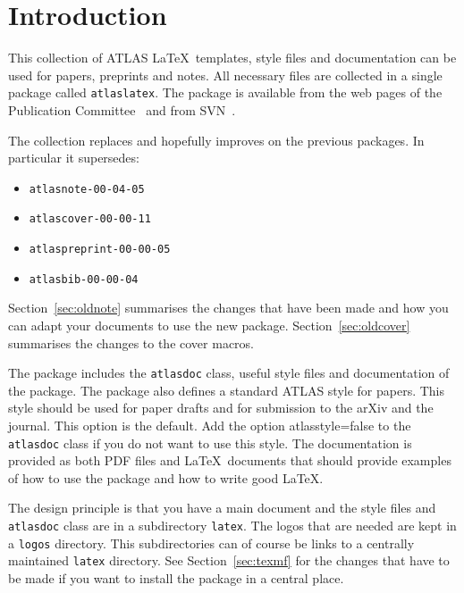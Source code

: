 \documentclass[UKenglish]{latex/atlasdoc}
\author{Ian C. Brock}
\affil{University of Bonn}
\newcommand{\File}[1]{\texttt{#1}\xspace}
\newcommand{\Option}[1]{\textsf{#1}\xspace}
\newcommand{\Package}[1]{\texttt{#1}\xspace}
\begin{document}
\tableofcontents
\clearpage

\section{Introduction}
\label{sec:intro}

This collection of ATLAS \LaTeX\ templates, style files and documentation
can be used for papers, preprints and notes. 
All necessary files are collected in a single package called \texttt{atlaslatex}.
The package is available from the web pages of the Publication Committee~\cite{pubcom} and from 
SVN~\cite{pubcom-svn}.

The collection replaces and hopefully improves on the previous packages. 
In particular it supersedes:
\begin{itemize}\setlength{\parskip}{0pt}\setlength{\itemsep}{0pt}
\item \texttt{atlasnote-00-04-05}
\item \texttt{atlascover-00-00-11}
\item \texttt{atlaspreprint-00-00-05}
\item \texttt{atlasbib-00-00-04}
\end{itemize}
Section~\ref{sec:oldnote} summarises the changes that have been made and
how you can adapt your documents to use the new package.
Section~\ref{sec:oldcover} summarises the changes to the cover macros.

The package includes the \Package{atlasdoc} class, useful style files
and documentation of the package.
The package also defines a standard ATLAS style for papers.
This style should be used for paper drafts and for submission to the arXiv and the journal.
This option is the default. Add the option \Option{atlasstyle=false} to the \Package{atlasdoc} class if you do not want to use this style.
The documentation is provided as both PDF files and \LaTeX\ documents
that should provide examples of how to use the package and how to write
good \LaTeX.

The design principle is that you have a main document and 
the style files and \Package{atlasdoc} class are in a subdirectory \File{latex}.
The logos that are needed are kept in a \File{logos} directory.
This subdirectories can of course be links to a centrally maintained \texttt{latex} directory.
See Section~\ref{sec:texmf} for the changes that have to be made if you want to install
the package in a central place.
\end{document}
